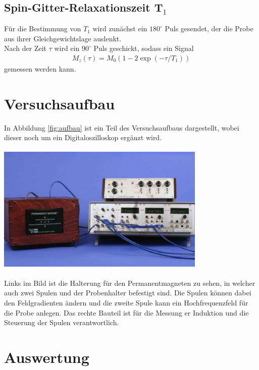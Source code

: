 \documentclass[]{scrartcl}
\begin{document}
\subsection{Spin-Gitter-Relaxationszeit T$_1$}
Für die Bestimmung von $T_1$ wird zunächst ein $180^\circ$ Puls gesendet, der die Probe aus ihrer Gleichgewichtslage auslenkt.\\
Nach der Zeit $\tau$ wird ein $90^\circ$ Puls geschickt, sodass ein Signal 
\begin{align}
M_{z}(\tau)=M_0(1-2\exp(-\tau/T_1))
\label{eq_T1}
\end{align}
gemessen werden kann.
\section{Versuchsaufbau}
In Abbildung \ref{fig:aufbau} ist ein Teil des Versuchsaufbaus dargestellt, wobei dieser noch um ein Digitaloszilloskop ergänzt wird.
\begin{center}
	\includegraphics[width=10cm]{images/aufbau.png}
	\label{fig:aufbau}
\end{center}
Links im Bild ist die Halterung für den Permanentmagneten zu sehen, in welcher auch zwei Spulen und der Probenhalter befestigt sind. Die Spulen können dabei den Feldgradienten ändern und die zweite Spule kann ein Hochfrequenzfeld für die Probe anlegen. Das rechte Bauteil ist für die Messung er Induktion und die Steuerung der Spulen verantwortlich.
\section{Auswertung}
\end{document}
